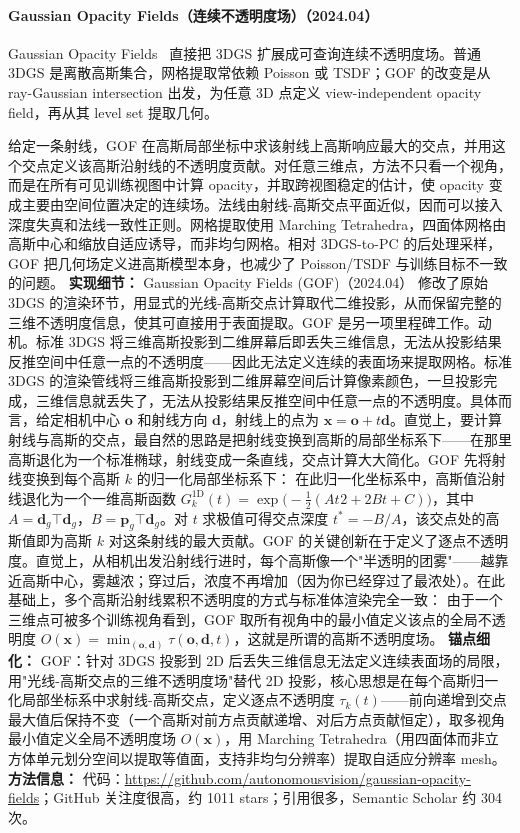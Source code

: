 \paragraph{Gaussian Opacity Fields（连续不透明度场）（2024.04）}
Gaussian Opacity Fields~\cite{2404_10772} 直接把 3DGS 扩展成可查询连续不透明度场。普通 3DGS 是离散高斯集合，网格提取常依赖 Poisson 或 TSDF；GOF 的改变是从 ray-Gaussian intersection 出发，为任意 3D 点定义 view-independent opacity field，再从其 level set 提取几何。

给定一条射线，GOF 在高斯局部坐标中求该射线上高斯响应最大的交点，并用这个交点定义该高斯沿射线的不透明度贡献。对任意三维点，方法不只看一个视角，而是在所有可见训练视图中计算 opacity，并取跨视图稳定的估计，使 opacity 变成主要由空间位置决定的连续场。法线由射线-高斯交点平面近似，因而可以接入深度失真和法线一致性正则。网格提取使用 Marching Tetrahedra，四面体网格由高斯中心和缩放自适应诱导，而非均匀网格。相对 3DGS-to-PC 的后处理采样，GOF 把几何场定义进高斯模型本身，也减少了 Poisson/TSDF 与训练目标不一致的问题。
\textbf{实现细节：} Gaussian Opacity Fields (GOF)（2024.04） 修改了原始 3DGS 的渲染环节，用显式的光线-高斯交点计算取代二维投影，从而保留完整的三维不透明度信息，使其可直接用于表面提取。GOF 是另一项里程碑工作。动机。标准 3DGS 将三维高斯投影到二维屏幕后即丢失三维信息，无法从投影结果反推空间中任意一点的不透明度——因此无法定义连续的表面场来提取网格。标准 3DGS 的渲染管线将三维高斯投影到二维屏幕空间后计算像素颜色，一旦投影完成，三维信息就丢失了，无法从投影结果反推空间中任意一点的不透明度。具体而言，给定相机中心 $\mathbf{o}$ 和射线方向 $\mathbf{d}$，射线上的点为 $\mathbf{x} = \mathbf{o} + t\mathbf{d}$。直觉上，要计算射线与高斯的交点，最自然的思路是把射线变换到高斯的局部坐标系下——在那里高斯退化为一个标准椭球，射线变成一条直线，交点计算大大简化。GOF 先将射线变换到每个高斯 $k$ 的归一化局部坐标系下： 在此归一化坐标系中，高斯值沿射线退化为一个一维高斯函数 $G_k^{\mathrm{1D}}(t) = \exp\!\bigl(-\frac{1}{2}(At^{}2 + 2Bt + C)\bigr)$，其中 $A = \mathbf{d}_g^{}\top\mathbf{d}_g$，$B = \mathbf{p}_g^{}\top\mathbf{d}_g$。对 $t$ 求极值可得交点深度 $t^{*} = -B/A$，该交点处的高斯值即为高斯 $k$ 对这条射线的最大贡献。GOF 的关键创新在于定义了逐点不透明度。直觉上，从相机出发沿射线行进时，每个高斯像一个"半透明的团雾"——越靠近高斯中心，雾越浓；穿过后，浓度不再增加（因为你已经穿过了最浓处）。在此基础上，多个高斯沿射线累积不透明度的方式与标准体渲染完全一致： 由于一个三维点可被多个训练视角看到，GOF 取所有视角中的最小值定义该点的全局不透明度 $O(\mathbf{x}) = \min_{(\mathbf{o},\mathbf{d})} \tau(\mathbf{o}, \mathbf{d}, t)$，这就是所谓的高斯不透明度场。
\textbf{锚点细化：} GOF：针对 3DGS 投影到 2D 后丢失三维信息无法定义连续表面场的局限，用"光线-高斯交点的三维不透明度场"替代 2D 投影，核心思想是在每个高斯归一化局部坐标系中求射线-高斯交点，定义逐点不透明度 $\tau_k(t)$——前向递增到交点最大值后保持不变（一个高斯对前方点贡献递增、对后方点贡献恒定），取多视角最小值定义全局不透明度场 $O(\mathbf{x})$，用 Marching Tetrahedra（用四面体而非立方体单元划分空间以提取等值面，支持非均匀分辨率）提取自适应分辨率 mesh。
\textbf{方法信息：} 代码：\url{https://github.com/autonomousvision/gaussian-opacity-fields}；GitHub 关注度很高，约 1011 stars；引用很多，Semantic Scholar 约 304 次。



